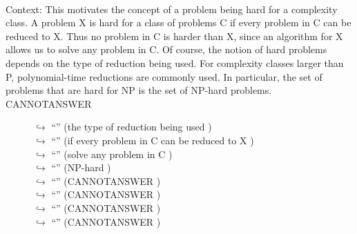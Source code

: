 \documentclass[11pt,a4paper, onecolumn]{article}
\begin{document}
\\ Context: This motivates the concept of a problem being hard for a complexity class. A problem X is hard for a class of problems C if every problem in C can be reduced to X. Thus no problem in C is harder than X, since an algorithm for X allows us to solve any problem in C. Of course, the notion of hard problems depends on the type of reduction being used. For complexity classes larger than P, polynomial-time reductions are commonly used. In particular, the set of problems that are hard for NP is the set of NP-hard problems. CANNOTANSWER

\begin{figure}[t] \small \begin{tcolorbox}[boxsep=0pt,left=5pt,right=0pt,top=2pt,colback = yellow!5] \begin{dialogue}
 \small 
\colorbox{pink!25}{$\hookrightarrow$}
{ ``'' (the type of reduction being used ) }
\\
\colorbox{pink!25}{$\hookrightarrow$}
{ ``'' (if every problem in C can be reduced to X ) }
\\
\colorbox{pink!25}{$\hookrightarrow$}
{ ``'' (solve any problem in C ) }
\\
\colorbox{pink!25}{$\hookrightarrow$}
{ ``'' (NP-hard ) }
\\
\colorbox{pink!25}{$\hookrightarrow$}
{ ``'' (CANNOTANSWER ) }
\\
\colorbox{pink!25}{$\hookrightarrow$}
{ ``'' (CANNOTANSWER ) }
\\
\colorbox{pink!25}{$\hookrightarrow$}
{ ``'' (CANNOTANSWER ) }
\\
\colorbox{pink!25}{$\hookrightarrow$}
{ ``'' (CANNOTANSWER ) }
\\
 \end{dialogue}\end{tcolorbox}\end{figure}
\end{document}
